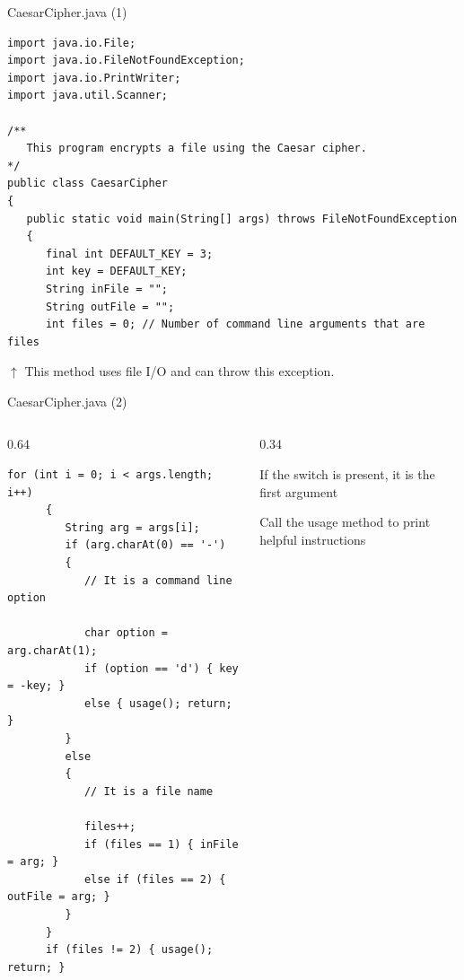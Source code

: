 \documentclass[aspectratio=43,10pt,t]{beamer}
\newcommand{\callout}[2][\linewidth]{%
  {\setlength{\fboxsep}{3pt}\colorbox{callout}{%
    \parbox{\dimexpr#1-6pt\relax}{\raggedright\footnotesize #2}}}}
\begin{document}
\begin{frame}[fragile]{CaesarCipher.java (1)}
\begin{lstlisting}[style=program]
import java.io.File;
import java.io.FileNotFoundException;
import java.io.PrintWriter;
import java.util.Scanner;

/**
   This program encrypts a file using the Caesar cipher.
*/
public class CaesarCipher
{
   public static void main(String[] args) throws FileNotFoundException
   {
      final int DEFAULT_KEY = 3;
      int key = DEFAULT_KEY;
      String inFile = "";
      String outFile = "";
      int files = 0; // Number of command line arguments that are files

\end{lstlisting}
  \hfill\callout[0.42\linewidth]{$\uparrow$ This method uses file I/O and can throw this exception.}
\end{frame}

\begin{frame}[fragile]{CaesarCipher.java (2)}
  \begin{columns}[T]
    \begin{column}{0.64\textwidth}
\begin{lstlisting}[style=program,firstnumber=19]
      for (int i = 0; i < args.length; i++)
      {
         String arg = args[i];
         if (arg.charAt(0) == '-')
         {
            // It is a command line option

            char option = arg.charAt(1);
            if (option == 'd') { key = -key; }
            else { usage(); return; }
         }
         else
         {
            // It is a file name

            files++;
            if (files == 1) { inFile = arg; }
            else if (files == 2) { outFile = arg; }
         }
      }
      if (files != 2) { usage(); return; }
\end{lstlisting}
    \end{column}
    \begin{column}{0.34\textwidth}
      \vskip4mm
      \callout{If the switch is present, it is the first argument}
      \vskip38mm
      \callout{Call the usage method to print helpful instructions}
    \end{column}
  \end{columns}
\end{frame}
\end{document}
